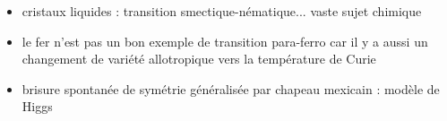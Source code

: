 \begin{remarques}
\begin{itemize}
\item cristaux liquides : transition smectique-nématique... vaste sujet chimique
\item le fer n'est pas un bon exemple de transition para-ferro car il y a aussi un changement de variété allotropique vers la température de Curie
\item brisure spontanée de symétrie généralisée par chapeau mexicain : modèle de Higgs
\end{itemize} \end{remarques}